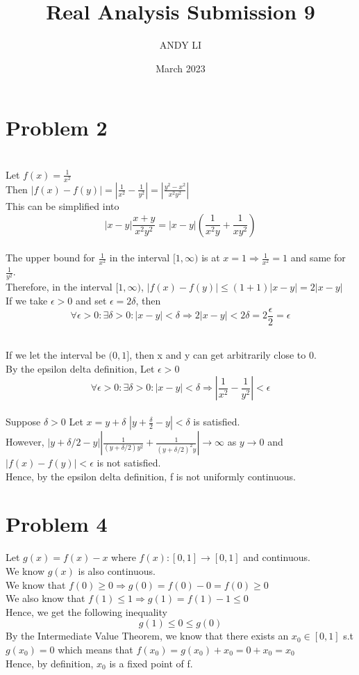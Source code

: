 \documentclass{article}
\title{Real Analysis Submission 9}
\author{ANDY LI}
\date{March 2023}
\begin{document}
\maketitle
\section*{Problem 2}
\\Let $f(x) = \frac{1}{x^2}$
\\Then $|f(x) - f(y)| = |\frac{1}{x^2} - \frac{1}{y^2}| = |\frac{y^2 - x^2}{x^2y^2}|$
\\This can be simplified into $$|x - y|\frac{x + y}{x^2y^2} = |x - y|(\frac{1}{x^2y} + \frac{1}{xy^2})$$
\\The upper bound for $\frac{1}{x^2}$ in the interval $[1, \infty)$ is at $x = 1 \Rightarrow \frac{1}{x^2} = 1$ and same for $\frac{1}{y^2}$.
\\Therefore, in the interval $[1, \infty)$, $|f(x) - f(y)| \leq (1+1)|x - y| = 2|x - y|$
\\If we take $\epsilon > 0$ and set $\epsilon = 2\delta$, then $$\forall \epsilon > 0 : \exists \delta > 0 : |x - y| < \delta \Rightarrow 2|x - y| < 2\delta = 2\frac{\epsilon}{2} = \epsilon$$

\\If we let the interval be $(0, 1]$, then x and y can get arbitrarily close to 0.
\\By the epsilon delta definition, Let $\epsilon > 0$ $$\forall \epsilon > 0 : \exists \delta > 0 : |x - y| < \delta \Rightarrow |\frac{1}{x^2} - \frac{1}{y^2}| < \epsilon$$
\\Suppose $\delta > 0$ Let $x = y + \delta$
$|y + \frac{\delta}{2} - y| < \delta$ is satisfied.
\\However, $|y + \delta/2 -y||\frac{1}{(y + \delta/2)y^2} + \frac{1}{(y+\delta/2)^2y}| \to \infty$ as $y \to 0$ and $|f(x) - f(y)| < \epsilon$ is not satisfied.
\\Hence, by the epsilon delta definition, f is not uniformly continuous.

\section*{Problem 4}
Let $g(x) = f(x) - x$ where $f(x): [0, 1] \to [0, 1]$ and continuous.
\\We know $g(x)$ is also continuous.
\\We know that $f(0) \geq 0 \Rightarrow g(0) = f(0) - 0 = f(0) \geq 0$
\\We also know that $f(1) \leq 1 \Rightarrow g(1) = f(1) - 1 \leq 0$
\\Hence, we get the following inequality $$g(1) \leq 0 \leq g(0)$$
By the Intermediate Value Theorem, we know that there exists an $x_0 \in [0, 1]$ s.t $g(x_0) = 0$ which means that $f(x_0) = g(x_0) + x_0 = 0 + x_0 = x_0$
\\Hence, by definition, $x_0$ is a fixed point of f.
\end{document}
